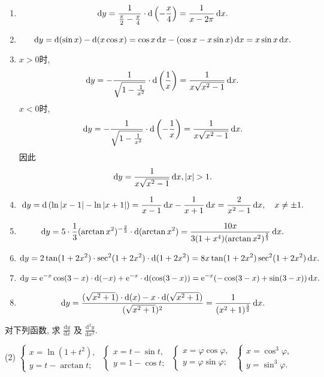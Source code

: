 \begin{solution}
    \begin{enumerate}
        \item $$\operatorname{d\!} y = \frac{1}{\frac{\pi}{2}-\frac{x}{4}} \cdot \operatorname{d}\left( -\frac{x}{4} \right) = \frac{1}{x - 2\pi} \operatorname{d\!} x.$$
        \item $$\operatorname{d\!} y = \operatorname{d}(\sin x) - \operatorname{d}(x\cos x) = \cos x \operatorname{d\!} x - (\cos x - x\sin x) \operatorname{d\!} x = x\sin x \operatorname{d\!} x.$$
        \item $x > 0$时, $$\operatorname{d\!} y = -\frac{1}{\sqrt{1-\frac{1}{x^2}}} \cdot \operatorname{d}\left( \frac{1}{x} \right) = \frac{1}{x\sqrt{x^2-1}} \operatorname{d\!} x.$$
              $x < 0$时, $$\operatorname{d\!} y = -\frac{1}{\sqrt{1-\frac{1}{x^2}}} \cdot \operatorname{d}\left( -\frac{1}{x} \right) = \frac{1}{x\sqrt{x^2-1}} \operatorname{d\!} x.$$
              因此$$\operatorname{d\!} y = \frac{1}{x\sqrt{x^2-1}} \operatorname{d\!} x, |x| > 1.$$
        \item $$\operatorname{d\!} y = \operatorname{d}\left( \ln|x-1| - \ln|x+1| \right) = \frac{1}{x-1} \operatorname{d\!} x - \frac{1}{x+1} \operatorname{d\!} x = \frac{2}{x^2-1} \operatorname{d\!} x, \quad x \neq \pm 1.$$
        \item $$\operatorname{d\!} y = 5 \cdot \frac{1}{3} (\arctan x^2)^{-\frac{2}{3}} \cdot \operatorname{d}(\arctan x^2) = \frac{10x}{3(1+x^4)(\arctan x^2)^{\frac{2}{3}}} \operatorname{d\!} x.$$
        \item $$\operatorname{d\!} y = 2\tan(1+2x^2) \cdot \sec^2(1+2x^2) \cdot \operatorname{d}(1+2x^2) = 8x \tan(1+2x^2) \sec^2(1+2x^2) \operatorname{d\!} x.$$
        \item $$\operatorname{d\!} y = \mathrm{e}^{-x} \cos(3-x) \cdot \operatorname{d}(-x) + \mathrm{e}^{-x} \cdot \operatorname{d}(\cos(3-x)) = \mathrm{e}^{-x} (-\cos(3-x) + \sin(3-x)) \operatorname{d\!} x.$$
        \item $$\operatorname{d\!} y = \frac{(\sqrt{x^2+1}) \cdot \operatorname{d}(x) - x \cdot \operatorname{d}(\sqrt{x^2+1})}{(\sqrt{x^2+1})^2} = \frac{1}{(x^2+1)^{\frac32}} \operatorname{d\!} x.$$
    \end{enumerate}
\end{solution}

\begin{exercise}[3.2.3]
    对下列函数, 求 $\frac{\mathrm{d}y}{\mathrm{d}x}$ 及 $\frac{\mathrm{d}^2y}{\mathrm{d}x^2}$.
    \begin{tasks}[label=(\arabic*)](2)
        \task $\begin{cases} x=\ln(1+t^2), \\ y=t-\arctan t; \end{cases}$
        \task $\begin{cases} x=t-\sin t, \\ y=1-\cos t; \end{cases}$
        \task $\begin{cases} x=\varphi\cos\varphi, \\ y=\varphi\sin\varphi; \end{cases}$
        \task $\begin{cases} x=\cos^3\varphi, \\ y=\sin^3\varphi. \end{cases}$
    \end{tasks}
\end{exercise}

